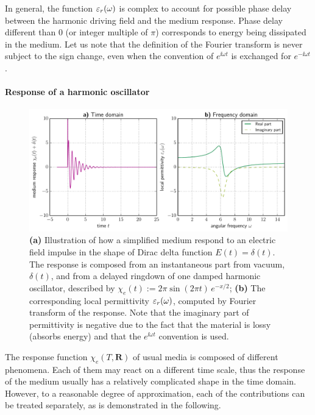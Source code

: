 In general, the function $\varepsilon_r(\omega)$ is complex to account for possible phase delay between the harmonic driving field and the medium response. Phase delay different than $0$ (or integer multiple of $\pi$) corresponds to energy being dissipated in the medium.
Let us note that the definition of the Fourier transform is never subject to the sign change, even when the convention of $e^{\ii \omega t}$ is exchanged for $e^{-\ii \omega t}$.
\paragraph{Response of a harmonic oscillator} \label{chap_lorentzmedia} %
\begin{figure}[t] \caption{\textbf{(a)} Illustration of how a simplified medium respond to an electric field impulse in the shape of Dirac delta function  $E(t) = \delta(t)$. The response is composed from an instantaneous part from vacuum, $\delta(t)$, and from a delayed ringdown of one damped harmonic oscillator, described by $\chi_e(t) := 2\pi \sin(2\pi t)\,e^{-x/2}$; \textbf{(b)} The corresponding local permittivity $\varepsilon_r(\omega)$, computed by Fourier transform of the response. Note that the imaginary part of permittivity is negative due to the fact that the material is lossy (absorbs energy) and that the $e^{\ii\omega t}$ convention is used.} \label{fg_oscillator_spectrum} \centering 
	\includegraphics[width=\textwidth]{img/oscillator_spectrum.pdf}
\end{figure}
The response function $\chi_e(T, \mathbf{R})$ of usual media is composed of different phenomena.  Each of them may react on a different time scale, thus the response of the medium usually has a relatively complicated shape in the time domain.  However, to a reasonable degree of approximation, each of the contributions can be treated separately, as is demonstrated in the following.

